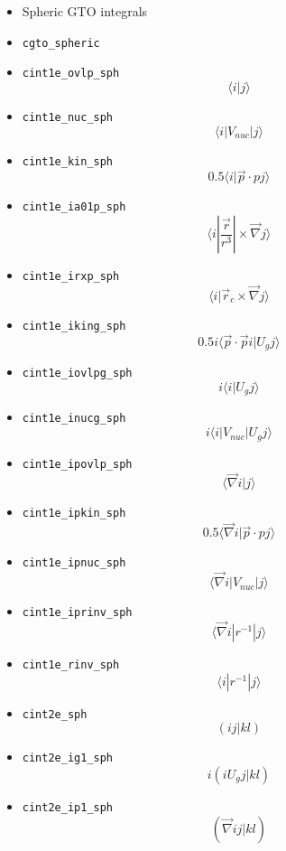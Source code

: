 \documentclass{article}
\begin{document}
\begin{itemize}
\item
  Spheric GTO integrals
\item
  \verb!cgto_spheric!\\
\item
  \verb!cint1e_ovlp_sph! \[\langle  i| j\rangle \]
\item
  \verb!cint1e_nuc_sph! \[\langle  i| V_{nuc}| j\rangle \]
\item
  \verb!cint1e_kin_sph! \[0.5\langle i| \vec{p} \cdot pj\rangle \]
\item
  \verb!cint1e_ia01p_sph!
  \[\langle i| \frac{\vec{r}}{r^3}| \times \vec{\nabla} j\rangle \]
\item
  \verb!cint1e_irxp_sph!
  \[\langle i| \vec{r}_c \times \vec{\nabla} j\rangle \]
\item
  \verb!cint1e_iking_sph!
  \[0.5i\langle \vec{p} \cdot \vec{p} i| U_gj\rangle \]
\item
  \verb!cint1e_iovlpg_sph! \[i\langle i| U_gj\rangle \]
\item
  \verb!cint1e_inucg_sph! \[i\langle i| V_{nuc}| U_gj\rangle \]
\item
  \verb!cint1e_ipovlp_sph! \[\langle \vec{\nabla} i|j\rangle \]
\item
  \verb!cint1e_ipkin_sph!
  \[0.5\langle \vec{\nabla} i| \vec{p} \cdot pj\rangle \]
\item
  \verb!cint1e_ipnuc_sph!
  \[\langle \vec{\nabla} i| V_{nuc}|j\rangle \]
\item
  \verb!cint1e_iprinv_sph!
  \[\langle \vec{\nabla} i| r^{-1}|j\rangle \]
\item
  \verb!cint1e_rinv_sph! \[\langle i| r^{-1} |j\rangle \]
\item
  \verb!cint2e_sph! \[(ij|kl)\]
\item
  \verb!cint2e_ig1_sph! \[i(i U_g j|kl)\]
\item
  \verb!cint2e_ip1_sph! \[(\vec{\nabla} i j|kl)\]


\end{itemize}
\end{document}
